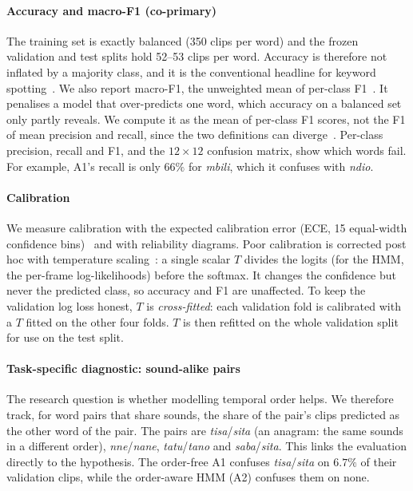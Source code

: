 \paragraph{Accuracy and macro-F1 (co-primary)}
The training set is exactly balanced (350 clips per word) and the frozen validation and test splits hold 52--53
clips per word. Accuracy is therefore not inflated by a majority class, and it is the conventional headline for
keyword spotting~\cite{warden2018speech}. We also report macro-F1, the unweighted mean of per-class
F1~\cite{sokolova2009systematic}. It penalises a model that over-predicts one word, which accuracy on a balanced
set only partly reveals. We compute it as the mean of per-class F1 scores, not the F1 of mean precision and
recall, since the two definitions can diverge~\cite{opitz2019macro}. Per-class precision, recall and F1, and
the $12\times12$ confusion matrix, show which words fail. For example, A1's recall is only $66\%$ for
\textit{mbili}, which it confuses with \textit{ndio}.

\paragraph{Calibration}
We measure calibration with the expected calibration error (ECE, 15 equal-width confidence
bins)~\cite{naeini2015obtaining,guo2017calibration} and with reliability diagrams. Poor calibration is corrected
post hoc with temperature scaling~\cite{guo2017calibration}: a single scalar $T$ divides the logits (for the
HMM, the per-frame log-likelihoods) before the softmax. It changes the confidence but never the predicted
class, so accuracy and F1 are unaffected. To keep the validation log loss honest, $T$ is \emph{cross-fitted}:
each validation fold is calibrated with a $T$ fitted on the other four folds. $T$ is then refitted on the whole
validation split for use on the test split.

\paragraph{Task-specific diagnostic: sound-alike pairs}
The research question is whether modelling temporal order helps. We therefore track, for word pairs that share
sounds, the share of the pair's clips predicted as the other word of the pair. The pairs are
\textit{tisa}/\textit{sita} (an anagram: the same sounds in a different order), \textit{nne}/\textit{nane},
\textit{tatu}/\textit{tano} and \textit{saba}/\textit{sita}. This links the evaluation directly to the
hypothesis. The order-free A1 confuses \textit{tisa}/\textit{sita} on $6.7\%$ of their validation clips, while
the order-aware HMM (A2) confuses them on none.


